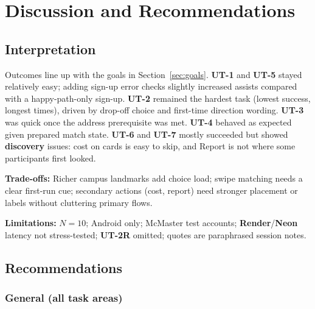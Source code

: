 \section{Discussion and Recommendations}
\label{sec:discussion}

\subsection{Interpretation}

Outcomes line up with the goals in Section~\ref{sec:goals}. \textbf{UT-1} and \textbf{UT-5} stayed relatively easy; adding sign-up error checks slightly increased assists compared with a happy-path-only sign-up. \textbf{UT-2} remained the hardest task (lowest success, longest times), driven by drop-off choice and first-time direction wording. \textbf{UT-3} was quick once the address prerequisite was met. \textbf{UT-4} behaved as expected given prepared match state. \textbf{UT-6} and \textbf{UT-7} mostly succeeded but showed \textbf{discovery} issues: cost on cards is easy to skip, and Report is not where some participants first looked.

\textbf{Trade-offs:} Richer campus landmarks add choice load; swipe matching needs a clear first-run cue; secondary actions (cost, report) need stronger placement or labels without cluttering primary flows.

\textbf{Limitations:} $N=10$; Android only; McMaster test accounts; \textbf{Render}\slash\textbf{Neon} latency not stress-tested; \textbf{UT-2R} omitted; quotes are paraphrased session notes.

\subsection{Recommendations}

\subsubsection{General (all task areas)}

